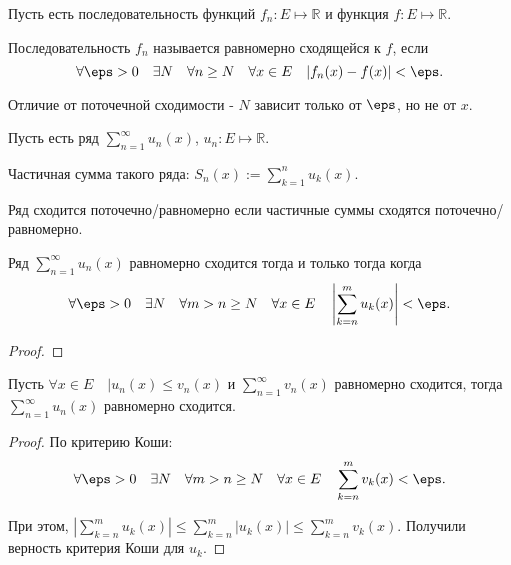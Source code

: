 \begin{definition} \thmslashn 

    Пусть есть последовательность функций $f_{n} : E \mapsto \mathbb{R}$ и функция $f : E \mapsto \mathbb{R}$.

    Последовательность $f_{n}$ называется равномерно сходящейся к $f$, если
    \[ \forall{\eps > 0}\quad \exists{N}\quad \forall{n \ge N}\quad \forall{x\in E}\quad |f_{n}(x) - f(x)| < \eps  .\] 
\end{definition}
\begin{remark} \thmslashn

    Отличие от поточечной сходимости - $N$ зависит только от $\eps$, но не от $x$.
\end{remark}
\begin{definition} \thmslashn 

    Пусть есть ряд $\sum\limits_{n=1}^{\infty} u_{n}(x)$, $u_{n} : E \mapsto \mathbb{R}$.

    Частичная сумма такого ряда: $S_{n}(x) := \sum\limits_{k=1}^{n} u_{k}(x)$.

    Ряд сходится поточечно/равномерно если частичные суммы сходятся поточечно/равномерно.
\end{definition}
\begin{theorem} \thmslashn

    Ряд $\sum\limits_{n=1}^{\infty} u_{n}(x)$ равномерно сходится тогда и только тогда когда
    \[ \forall{\eps > 0}\quad \exists{N}\quad \forall{m > n \ge N}\quad \forall{x\in E}\quad \left|\sum\limits_{k=n}^{m} u_{k}(x)\right| < \eps  .\] 
    \begin{proof} \thmslashn
    
        \TODO
    \end{proof}
\end{theorem}
\begin{theorem} \thmslashn

    Пусть $\forall{x\in E}\quad |u_{n}(x) \le v_{n}(x)$ и $\sum\limits_{n=1}^{\infty} v_{n}(x)$ равномерно сходится, тогда $\sum\limits_{n=1}^{\infty} u_{n}(x)$ равномерно сходится.
    \begin{proof} \thmslashn
    
        По критерию Коши: 
        \[ \forall{\eps > 0}\quad \exists{N}\quad \forall{m > n \ge N}\quad \forall{x\in E}\quad \sum\limits_{k=n}^{m} v_{k}(x) < \eps .\]

        При этом, $\left| \sum\limits_{k=n}^{m} u_{k}(x)\right| \le  \sum\limits_{k=n}^{m} |u_{k}(x)| \le \sum\limits_{k=n}^{m} v_{k}(x)$. Получили верность критерия Коши для $u_{k}$.
    \end{proof}
\end{theorem}
